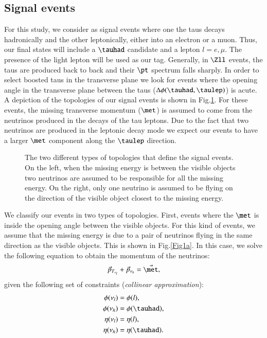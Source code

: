 \subsection{Signal events}\label{signalevents}
For this study, we consider as signal events where one the taus decays hadronically and the other leptonically, either into an electron or a muon. Thus, our final states will include a $\tauhad$ candidate and a lepton $l=e,\mu$. The presence of the light lepton will be used as our tag. 
Generally, in $\Zll$ events, the taus are produced back to back and their $\pt$ spectrum falls sharply. In order to select boosted taus in the transverse plane we look for events where the opening angle in the transverse plane between the taus ($\Delta\phi(\tauhad,\taulep)$) is acute. A depiction of the topologies of our signal events is shown in Fig.\ref{Fig1}. For these events, the missing transverse momentum ($\met$) is assumed to come from the neutrinos produced in the decays of the tau leptons. Due to the fact that two neutrinos are produced in the leptonic decay mode we expect our events to have a larger $\met$ component along the $\taulep$ direction.
\begin{figure}[htbp]
	\centering
	\hfill
	\caption{The two different types of topologies that define the signal events. On the left, when the missing energy is between the visible objects two neutrinos are assumed to be responsible for all the missing energy. On the right, only one neutrino is assumed to be flying on the direction of the visible object closest to the missing energy.}
	\label{Fig1}
\end{figure}
We classify our events in two types of topologies. First, events where the $\met$ is inside the opening angle between the visible objects. For this kind of events, we assume that the missing energy is due to a pair of neutrinos flying in the same direction as the visible objects. This is shown in Fig.\ref{Fig1a}. In this case, we solve the following equation to obtain the momentum of the neutrinos:
\begin{equation}
\vec{p}_{T_{\nu_l}}+\vec{p}_{\nu_h}=\vec{\met},
\end{equation}
given the following set of constraints (\textit{collinear approximation}):
\begin{align}
	\phi(\nu_l)&=\phi(l),
	\\
	\phi(\nu_h)&=\phi(\tauhad),
	\\
	\eta(\nu_l)&=\eta(l),
	\\
	\eta(\nu_h)&=\eta(\tauhad).
\end{align}
